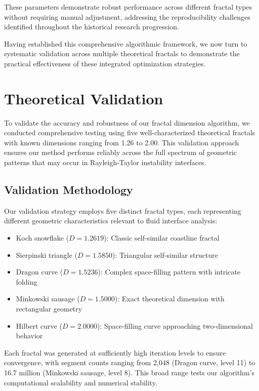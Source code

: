 \documentclass[preprint,12pt]{elsarticle}
\def\textbf#1{#1}%
\begin{document}
These parameters demonstrate robust performance across different fractal types without requiring manual adjustment, addressing the reproducibility challenges identified throughout the historical research progression.

Having established this comprehensive algorithmic framework, we now turn to systematic validation across multiple theoretical fractals to demonstrate the practical effectiveness of these integrated optimization strategies.

\section{Theoretical Validation}

To validate the accuracy and robustness of our fractal dimension algorithm, we conducted comprehensive testing using five well-characterized theoretical fractals with known dimensions ranging from 1.26 to 2.00. This validation approach ensures our method performs reliably across the full spectrum of geometric patterns that may occur in Rayleigh-Taylor instability interfaces.

\subsection{Validation Methodology}

Our validation strategy employs five distinct fractal types, each representing different geometric characteristics relevant to fluid interface analysis:

\begin{itemize}
\item \textbf{Koch snowflake} ($D = 1.2619$): Classic self-similar coastline fractal
\item \textbf{Sierpinski triangle} ($D = 1.5850$): Triangular self-similar structure
\item \textbf{Dragon curve} ($D = 1.5236$): Complex space-filling pattern with intricate folding
\item \textbf{Minkowski sausage} ($D = 1.5000$): Exact theoretical dimension with rectangular geometry
\item \textbf{Hilbert curve} ($D = 2.0000$): Space-filling curve approaching two-dimensional behavior
\end{itemize}

Each fractal was generated at sufficiently high iteration levels to ensure convergence, with segment counts ranging from 2,048 (Dragon curve, level 11) to 16.7 million (Minkowski sausage, level 8). This broad range tests our algorithm's computational scalability and numerical stability.
\end{document}
